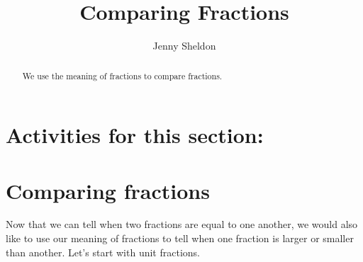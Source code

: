 \documentclass{ximera}
\title{Comparing Fractions}
\author{Jenny Sheldon}
\begin{document}
\begin{abstract}
We use the meaning of fractions to compare fractions.
\end{abstract}
\maketitle

\section{Activities for this section:}


\section{Comparing fractions}

Now that we can tell when two fractions are equal to one another, we would also like to use our meaning of fractions to tell when one fraction is larger or smaller than another. Let's start with unit fractions.
\end{document}
